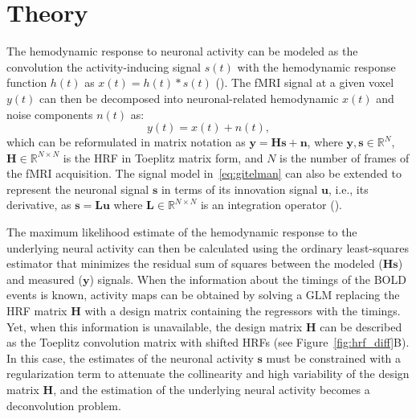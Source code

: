 \section{Theory}


The hemodynamic response to neuronal activity can be modeled as the convolution the activity-inducing signal \(s(t)\) with the hemodynamic response function \(h(t)\) as \(x(t) = h(t) * s(t)\) (\citealt{gitelman2003ModelingRegionalPsychophysiologic}). The fMRI signal at a given voxel \(y(t)\) can then be decomposed into neuronal-related hemodynamic \(x(t)\) and noise components \(n(t)\) as:
\begin{equation}
    \label{eq:gitelman}
    y(t) = x(t) + n(t),
\end{equation}
which can be reformulated in matrix notation as \(\mathbf{y} = \mathbf{Hs} + \mathbf{n}\), where \(\mathbf{y, s} \in \mathbb{R}^N\), \(\mathbf{H} \in \mathbb{R}^{N \times N}\) is the HRF in Toeplitz matrix form, and \(N\) is the number of frames of the fMRI acquisition. The signal model in~\eqref{eq:gitelman} can also be extended to represent the neuronal signal \(\mathbf{s}\) in terms of its innovation signal \(\mathbf{u}\), i.e., its derivative, as \(\mathbf{s} = \mathbf{Lu}\) where \(\mathbf{L} \in \mathbb{R}^{N \times N}\) is an integration operator (\citealt{cherkaoui2019SparsitybasedBlindDeconvolution,urunuela2020StabilityBasedSparseParadigm}).

The maximum likelihood estimate of the hemodynamic response to the underlying neural activity can then be calculated using the ordinary least-squares estimator that minimizes the residual sum of squares between the modeled (\(\mathbf{Hs}\)) and measured (\(\mathbf{y}\)) signals. When the information about the timings of the BOLD events is known, activity maps can be obtained by solving a GLM replacing the HRF matrix \(\mathbf{H}\) with a design matrix containing the regressors with the timings. Yet, when this information is unavailable, the design matrix \(\mathbf{H}\) can be described as the Toeplitz convolution matrix with shifted HRFs (see Figure~\ref{fig:hrf_diff}B). In this case, the estimates of the neuronal activity \(\mathbf{s}\) must be constrained with a regularization term to attenuate the collinearity and high variability of the design matrix \(\mathbf{H}\), and the estimation of the underlying neural activity becomes a deconvolution problem.

